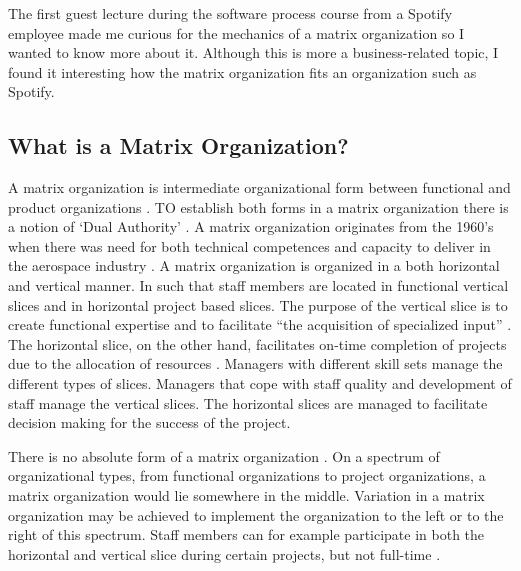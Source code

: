 \subsubsection*{}
The first guest lecture during the software process course from a Spotify employee made me curious for the mechanics of a matrix organization so I wanted to know more about it. Although this is more a business-related topic, I found it interesting how the matrix organization fits an organization such as Spotify.

\subsection*{What is a Matrix Organization?}
A matrix organization is intermediate organizational form between functional and product organizations \autocite[70]{MEE196470}.
TO establish both forms in a matrix organization there is a notion of `Dual Authority' \autocite[36]{Galbraith197129}.
A matrix organization originates from the 1960's when there was need for both technical competences and capacity to deliver in the aerospace industry \autocite[30, 39]{Galbraith197129}.
A matrix organization is organized in a both horizontal and vertical manner. In such that staff members are located in functional vertical slices and in horizontal project based slices. \autocite[70-71]{MEE196470}
The purpose of the vertical slice is to create functional expertise and to facilitate ``the acquisition of specialized input'' \autocite[30]{Galbraith197129}.
The horizontal slice, on the other hand, facilitates on-time completion of projects due to the allocation of resources \autocite[30]{Galbraith197129}.
Managers with different skill sets manage the different types of slices. Managers that cope with staff quality and development of staff manage the vertical slices. The horizontal slices are managed to facilitate decision making for the success of the project. \autocite[31]{Galbraith197129}

There is no absolute form of a matrix organization \autocite[117]{KNIGHT} \autocite[31-35]{Galbraith197129}. On a spectrum of organizational types, from functional organizations to project organizations, a matrix organization would lie somewhere in the middle. Variation in a matrix organization may be achieved to implement the organization to the left or to the right of this spectrum. Staff members can for example participate in both the horizontal and vertical slice during certain projects, but not full-time \autocite[114]{KNIGHT}.

